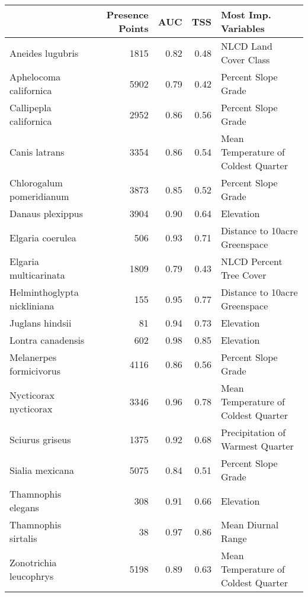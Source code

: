 \begin{longtable}{l|rrrl}
\toprule
\multicolumn{1}{l}{} & Presence Points & AUC & TSS & Most Imp. Variables \\ 
\midrule
Aneides lugubris & 1815 & 0.82 & 0.48 & NLCD Land Cover Class \\ 
Aphelocoma californica & 5902 & 0.79 & 0.42 & Percent Slope Grade \\ 
Callipepla californica & 2952 & 0.86 & 0.56 & Percent Slope Grade \\ 
Canis latrans & 3354 & 0.86 & 0.54 & Mean Temperature of Coldest Quarter \\ 
Chlorogalum pomeridianum & 3873 & 0.85 & 0.52 & Percent Slope Grade \\ 
Danaus plexippus & 3904 & 0.90 & 0.64 & Elevation \\ 
Elgaria coerulea & 506 & 0.93 & 0.71 & Distance to 10acre Greenspace \\ 
Elgaria multicarinata & 1809 & 0.79 & 0.43 & NLCD Percent Tree Cover \\ 
Helminthoglypta nickliniana & 155 & 0.95 & 0.77 & Distance to 10acre Greenspace \\ 
Juglans hindsii & 81 & 0.94 & 0.73 & Elevation \\ 
Lontra canadensis & 602 & 0.98 & 0.85 & Elevation \\ 
Melanerpes formicivorus & 4116 & 0.86 & 0.56 & Percent Slope Grade \\ 
Nycticorax nycticorax & 3346 & 0.96 & 0.78 & Mean Temperature of Coldest Quarter \\ 
Sciurus griseus & 1375 & 0.92 & 0.68 & Precipitation of Warmest Quarter \\ 
Sialia mexicana & 5075 & 0.84 & 0.51 & Percent Slope Grade \\ 
Thamnophis elegans & 308 & 0.91 & 0.66 & Elevation \\ 
Thamnophis sirtalis & 38 & 0.97 & 0.86 & Mean Diurnal Range \\ 
Zonotrichia leucophrys & 5198 & 0.89 & 0.63 & Mean Temperature of Coldest Quarter \\ 
\bottomrule
\end{longtable}


